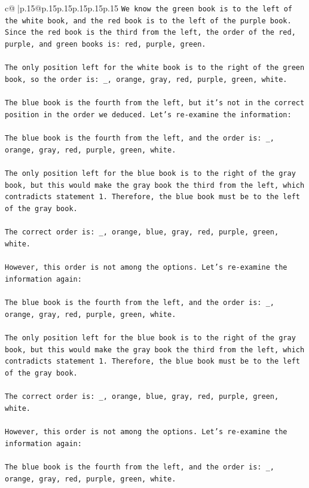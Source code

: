 \documentclass{article}
\begin{document}
{\begin{supertabular}{c@{$\;$}|p{.15\linewidth}@{}p{.15\linewidth}p{.15\linewidth}p{.15\linewidth}p{.15\linewidth}p{.15\linewidth}}
{{{\texttt{We know the green book is to the left of the white book, and the red book is to the left of the purple book. Since the red book is the third from the left, the order of the red, purple, and green books is: red, purple, green.} \\
\\ 
\texttt{The only position left for the white book is to the right of the green book, so the order is: \_, orange, gray, red, purple, green, white.} \\
\\ 
\texttt{The blue book is the fourth from the left, but it's not in the correct position in the order we deduced. Let's re{-}examine the information:} \\
\\ 
\texttt{The blue book is the fourth from the left, and the order is: \_, orange, gray, red, purple, green, white.} \\
\\ 
\texttt{The only position left for the blue book is to the right of the gray book, but this would make the gray book the third from the left, which contradicts statement 1. Therefore, the blue book must be to the left of the gray book.} \\
\\ 
\texttt{The correct order is: \_, orange, blue, gray, red, purple, green, white.} \\
\\ 
\texttt{However, this order is not among the options. Let's re{-}examine the information again:} \\
\\ 
\texttt{The blue book is the fourth from the left, and the order is: \_, orange, gray, red, purple, green, white.} \\
\\ 
\texttt{The only position left for the blue book is to the right of the gray book, but this would make the gray book the third from the left, which contradicts statement 1. Therefore, the blue book must be to the left of the gray book.} \\
\\ 
\texttt{The correct order is: \_, orange, blue, gray, red, purple, green, white.} \\
\\ 
\texttt{However, this order is not among the options. Let's re{-}examine the information again:} \\
\\ 
\texttt{The blue book is the fourth from the left, and the order is: \_, orange, gray, red, purple, green, white.} \\
}}}
\end{supertabular}}
\end{document}
